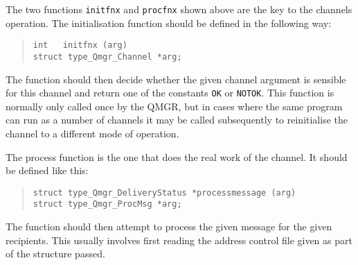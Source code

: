 The two functions \verb|initfnx| and \verb|procfnx| shown above are the key to the channels
operation. The initialisation function should be defined in the
following way:
\begin{quote}\begin{verbatim}
int   initfnx (arg)
struct type_Qmgr_Channel *arg;
\end{verbatim}\end{quote}

The function should then decide whether the given channel argument is
sensible for this channel and return one of the constants \verb|OK| or
\verb|NOTOK|. This function is normally only called once by the QMGR,
but in cases where the same program can run as a number of channels it
may be called subsequently to reinitialise the channel to a different
mode of operation.

The process function is the one that does the real work of the
channel. It should be defined like this:
\begin{quote}\begin{verbatim}
struct type_Qmgr_DeliveryStatus *processmessage (arg)
struct type_Qmgr_ProcMsg *arg;
\end{verbatim}\end{quote}
The function should then attempt to process the given message for the
given recipients. This usually involves first reading the address
control file given as part of the structure passed.

